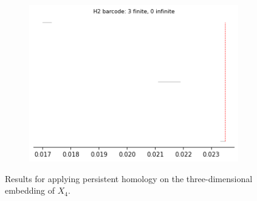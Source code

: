 \begin{figure}[H]
\begin{subfigure}[b]{0.24\textwidth}
\includegraphics[width=\textwidth]{figures/topology/X4_H2_barcode.png}
 \caption{}
\end{subfigure}
\caption{Results for applying persistent homology on the three-dimensional embedding of $X_4$.}
\end{figure}

